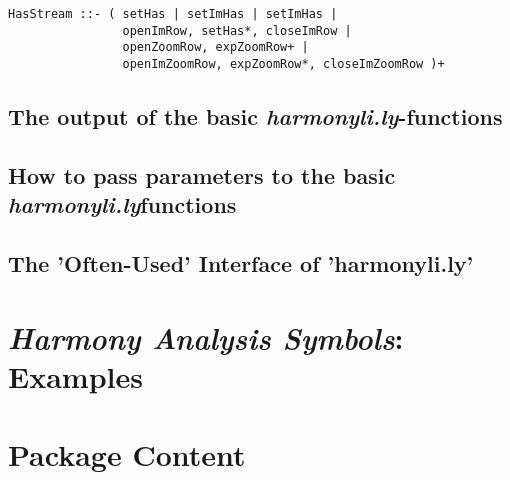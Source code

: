 \documentclass[
  DIV=calc,
  BCOR=5mm,
  12pt,
  headings=small,
  oneside,
  abstract=true,
  toc=bib,
  xcolor=dvipsnames,
  openany,
  ngerman,english]{scrartcl}
\newcommand{\hlyn}[0]{\textit{harmonyli.ly}}
\newcommand{\has}[1]{\textit{Harmony Analysis Symbol#1}}
\begin{document}
\begin{verbatim}
HasStream ::- ( setHas | setImHas | setImHas |
                openImRow, setHas*, closeImRow |
                openZoomRow, expZoomRow+ |
                openImZoomRow, expZoomRow*, closeImZoomRow )+
\end{verbatim}

\subsection{The output of the basic \hlyn-functions}

\subsection{How to pass parameters to the basic \hlyn\-functions}

\subsection{The 'Often-Used' Interface of 'harmonyli.ly'}

\section{\has{s}: Examples}

\section{Package Content}
















%
\printnomenclature


\end{document}
